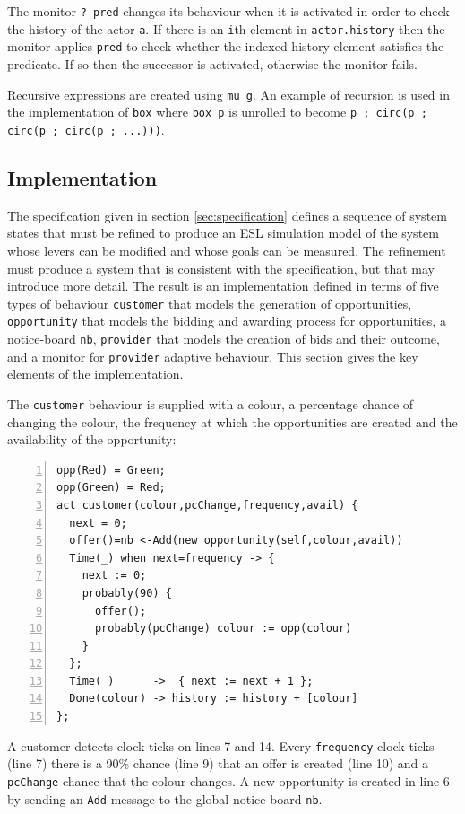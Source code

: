 \documentclass[10pt,numbers]{sigplanconf}
\def\code#1{{\normalfont\lstinline[basicstyle=\small\ttfamily]{#1}}}
\begin{document}
The monitor \code{? pred} changes its behaviour when it is activated in order to check the history of the actor \code{a}. If there is an \code{i}th element in \code{actor.history} then the monitor applies \code{pred} to check whether the indexed history element satisfies the predicate. If so then the successor is activated, otherwise the monitor fails.

Recursive expressions are created using \code{mu g}. An example of recursion is used in the implementation of \code{box} where \code{box p} is unrolled to become \code{p ; circ(p ; circ(p ; circ(p ; ...)))}.

\subsection{Implementation}

\label{sec:implementation}

The specification given in section \ref{sec:specification} defines a sequence of system states that must be refined to produce an ESL simulation model of the system whose levers can be modified and whose goals can be measured. The refinement must produce a system that is consistent with the specification, but that may introduce more detail. The result is an implementation defined in terms of five types of behaviour \code{customer} that models the generation of opportunities, \code{opportunity} that models the bidding and awarding process for opportunities, a notice-board \code{nb}, \code{provider} that models the creation of bids and their outcome, and a monitor for \code{provider} adaptive behaviour. This section gives the key elements of the implementation.

The \code{customer} behaviour is supplied with a colour, a percentage chance of changing the colour, the frequency at which the opportunities are created and the availability of the opportunity:
\begin{lstlisting}[numbers=left]
opp(Red) = Green;
opp(Green) = Red;
act customer(colour,pcChange,frequency,avail) {  
  next = 0;  
  offer()=nb <-Add(new opportunity(self,colour,avail))
  Time(_) when next=frequency -> { 
    next := 0;
    probably(90) {
      offer();
      probably(pcChange) colour := opp(colour) 
    } 
  };        
  Time(_)      ->  { next := next + 1 };
  Done(colour) -> history := history + [colour]           
};
\end{lstlisting}
A customer detects clock-ticks on lines 7 and 14. Every \code{frequency} clock-ticks (line 7) there is a 90\% chance (line 9) that an offer is created (line 10) and a \code{pcChange} chance that the colour changes. A new opportunity is created in line 6 by sending an \code{Add} message to the global notice-board \code{nb}.
\end{document}
